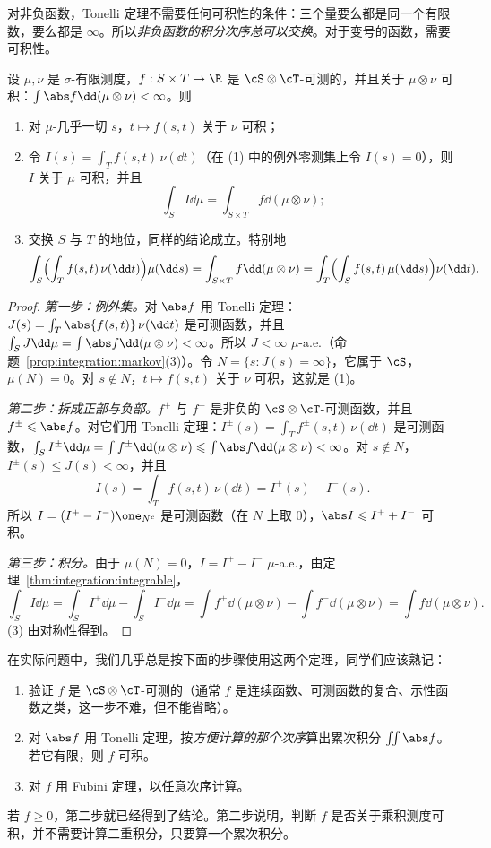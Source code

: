 对非负函数，Tonelli 定理不需要任何可积性的条件：三个量要么都是同一个有限数，要么都是 $\infty$。所以\emph{非负函数的积分次序总可以交换}。对于变号的函数，需要可积性。

\begin{theorem}[Fubini 定理]\label{thm:product:fubini}
设 $\mu,\nu$ 是 $\sigma$-有限测度，$f:S\times T\to\R$ 是 $\cS\otimes\cT$-可测的，并且关于 $\mu\otimes\nu$ 可积：$\int\abs f\dd(\mu\otimes\nu)<\infty$。则
\begin{enumerate}
\item 对 $\mu$-几乎一切 $s$，$t\mapsto f(s,t)$ 关于 $\nu$ 可积；
\item 令 $I(s)=\int_Tf(s,t)\,\nu(\dd t)$（在 (1) 中的例外零测集上令 $I(s)=0$），则 $I$ 关于 $\mu$ 可积，并且
\[
\int_SI\dd\mu=\int_{S\times T}f\dd(\mu\otimes\nu);
\]
\item 交换 $S$ 与 $T$ 的地位，同样的结论成立。特别地
\[
\int_S\Bigl(\int_Tf(s,t)\,\nu(\dd t)\Bigr)\mu(\dd s)=\int_{S\times T}f\dd(\mu\otimes\nu)=\int_T\Bigl(\int_Sf(s,t)\,\mu(\dd s)\Bigr)\nu(\dd t).
\]
\end{enumerate}
\end{theorem}
\begin{proof}
\emph{第一步：例外集。}对 $\abs f$ 用 Tonelli 定理：$J(s)=\int_T\abs{f(s,t)}\,\nu(\dd t)$ 是可测函数，并且 $\int_SJ\dd\mu=\int\abs f\dd(\mu\otimes\nu)<\infty$。所以 $J<\infty$ $\mu$-a.e.（命题~\ref{prop:integration:markov}(3)）。令 $N=\{s:J(s)=\infty\}$，它属于 $\cS$，$\mu(N)=0$。对 $s\notin N$，$t\mapsto f(s,t)$ 关于 $\nu$ 可积，这就是 (1)。

\emph{第二步：拆成正部与负部。}$f^+$ 与 $f^-$ 是非负的 $\cS\otimes\cT$-可测函数，并且 $f^\pm\leqslant\abs f$。对它们用 Tonelli 定理：$I^\pm(s)=\int_Tf^\pm(s,t)\,\nu(\dd t)$ 是可测函数，$\int_SI^\pm\dd\mu=\int f^\pm\dd(\mu\otimes\nu)\leqslant\int\abs f\dd(\mu\otimes\nu)<\infty$。对 $s\notin N$，$I^\pm(s)\leqslant J(s)<\infty$，并且
\[
I(s)=\int_Tf(s,t)\,\nu(\dd t)=I^+(s)-I^-(s).
\]
所以 $I=(I^+-I^-)\one_{N^c}$ 是可测函数（在 $N$ 上取 $0$），$\abs I\leqslant I^++I^-$ 可积。

\emph{第三步：积分。}由于 $\mu(N)=0$，$I=I^+-I^-$ $\mu$-a.e.，由定理~\ref{thm:integration:integrable}，
\[
\int_SI\dd\mu=\int_SI^+\dd\mu-\int_SI^-\dd\mu=\int f^+\dd(\mu\otimes\nu)-\int f^-\dd(\mu\otimes\nu)=\int f\dd(\mu\otimes\nu).
\]
(3) 由对称性得到。
\end{proof}

\begin{remark}
在实际问题中，我们几乎总是按下面的步骤使用这两个定理，同学们应该熟记：
\begin{enumerate}
\item 验证 $f$ 是 $\cS\otimes\cT$-可测的（通常 $f$ 是连续函数、可测函数的复合、示性函数之类，这一步不难，但不能省略）。
\item 对 $\abs f$ 用 Tonelli 定理，按\emph{方便计算的那个次序}算出累次积分 $\int\!\!\int\abs f$。若它有限，则 $f$ 可积。
\item 对 $f$ 用 Fubini 定理，以任意次序计算。
\end{enumerate}
若 $f\geqslant0$，第二步就已经得到了结论。第二步说明，判断 $f$ 是否关于乘积测度可积，并不需要计算二重积分，只要算一个累次积分。
\end{remark}

